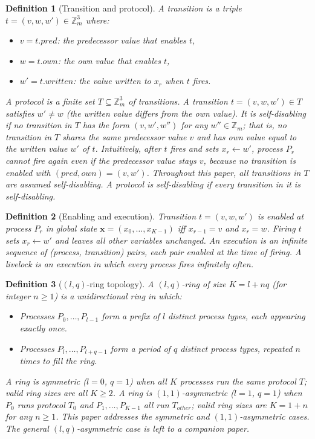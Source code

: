 \documentclass{article}
\newtheorem{definition}{Definition}
\newcommand{\Zm}{\mathbb{Z}_m}
\newcommand{\own}{\mathit{own}}
\newcommand{\writ}{\mathit{written}}
\newcommand{\pred}{\mathit{pred}}
\begin{document}
\begin{definition}[Transition and protocol]
\label{def:trans}
A \emph{transition} is a triple $t=(v,w,w')\in\Zm^3$ where:
\begin{itemize}
  \item $v = t.\pred$: the predecessor value that enables $t$,
  \item $w = t.\own$: the own value that enables $t$,
  \item $w' = t.\writ$: the value written to $x_r$ when $t$ fires.
\end{itemize}
A \emph{protocol} is a finite set $T\subseteq\Zm^3$ of transitions.
A transition $t=(v,w,w')\in T$ satisfies $w'\neq w$ (the written value
differs from the own value). It is \emph{self-disabling} if no
transition in $T$ has the form $(v, w', w'')$ for any $w''\in\Zm$;
that is, no transition in $T$ shares the same predecessor value $v$
and has own value equal to the written value $w'$ of $t$. Intuitively,
after $t$ fires and sets $x_r\!\leftarrow\!w'$, process $P_r$ cannot
fire again even if the predecessor value stays $v$, because no
transition is enabled with $(\pred,\own) = (v,w')$.
Throughout this paper, \emph{all transitions in $T$ are assumed
self-disabling}.
A \emph{protocol} is \emph{self-disabling} if every transition in it
is self-disabling.
\end{definition}

\begin{definition}[Enabling and execution]
\label{def:exec}
Transition $t=(v,w,w')$ is \emph{enabled} at process $P_r$ in global
state $\mathbf{x}=(x_0,\ldots,x_{K-1})$ iff $x_{r-1}=v$ and $x_r=w$.
Firing $t$ sets $x_r\leftarrow w'$ and leaves all other variables
unchanged. An \emph{execution} is an infinite sequence of
(process, transition) pairs, each pair enabled at the time of firing.
A \emph{livelock} is an execution in which every process fires
infinitely often.
\end{definition}

\begin{definition}[$(l,q)$-ring topology]
\label{def:lq}
A \emph{$(l,q)$-ring} of size $K = l + nq$ (for integer $n\geq 1$)
is a unidirectional ring in which:
\begin{itemize}
  \item Processes $P_0,\ldots,P_{l-1}$ form a \emph{prefix} of $l$
        distinct process types, each appearing exactly once.
  \item Processes $P_l,\ldots,P_{l+q-1}$ form a \emph{period} of $q$
        distinct process types, repeated $n$ times to fill the ring.
\end{itemize}
A ring is \emph{symmetric} ($l=0$, $q=1$) when all $K$ processes run
the same protocol $T$; valid ring sizes are all $K\geq 2$.
A ring is \emph{$(1,1)$-asymmetric} ($l=1$, $q=1$) when $P_0$ runs
protocol $T_0$ and $P_1,\ldots,P_{K-1}$ all run $T_{\mathit{other}}$;
valid ring sizes are $K = 1+n$ for any $n\geq 1$.
This paper addresses the symmetric and $(1,1)$-asymmetric cases.
The general $(l,q)$-asymmetric case is left to a companion paper.
\end{definition}
\end{document}
